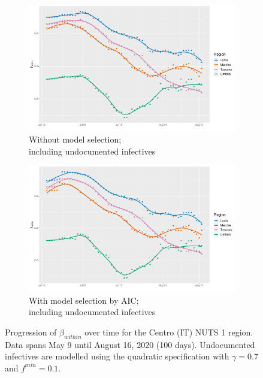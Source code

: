 \documentclass[12pt]{article}
\begin{document}
\begin{appendices}
\begin{figure}[H]
\begin{subfigure}{\textwidth}
    	      \includegraphics[width=0.92\linewidth]{output/model_within_lag14_betawithin_Centro (IT)_UndocQuadratic_rolling.pdf}
    	      \caption{Without model selection; \\ including undocumented infectives}
    	      \label{fig:beta_within_over_time_centro_regular_undoc}
    	    \end{subfigure}\newline
    	    \begin{subfigure}{\textwidth}
    	      \centering
    	      \includegraphics[width=0.92\linewidth]{output/model_within_lag14_betawithin_Centro (IT)_aic_UndocQuadratic_rolling.pdf}
    	      \caption{With model selection by AIC; \\ including undocumented infectives}
    	      \label{fig:beta_within_over_time_centro_aic_undoc}
    	    \end{subfigure}
    	    \caption{Progression of $\beta_{within}$ over time for the Centro (IT) NUTS 1 region. Data spans May 9 until August 16, 2020 (100 days). Undocumented infectives are modelled using the quadratic specification with $\gamma = 0.7$ and $f^{min}=0.1$.}
    	    \label{fig:beta_within_over_time_centro}
	    \end{figure}
		

\end{appendices}
\end{document}
